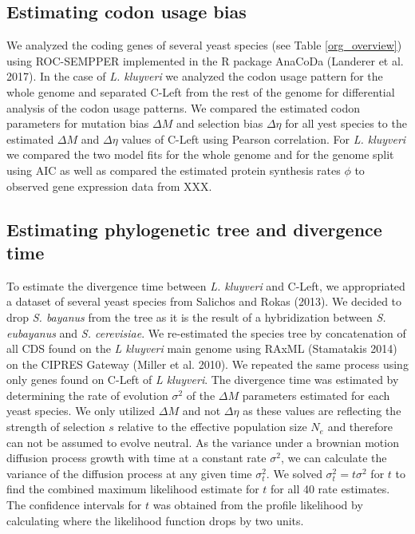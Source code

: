 \documentclass[12pt,draft]{article}
\begin{document}
\subsection{Estimating codon usage bias}
We analyzed the coding genes of several yeast species (see Table \ref{org_overview}) using ROC-SEMPPER \cite{gilchrist2015} implemented in the R package AnaCoDa (Landerer et al. 2017).
In the case of \textit{L. kluyveri} we analyzed the codon usage pattern for the whole genome and separated C-Left from the rest of the genome for differential analysis of the codon usage patterns.
We compared the estimated codon parameters for mutation bias $\Delta M$ and selection bias $\Delta \eta$ for all yest species to the estimated $\Delta M$ and $\Delta \eta$ values of C-Left using Pearson correlation.
For \textit{L. kluyveri} we compared the two model fits for the whole genome and for the genome split using AIC as well as compared the estimated protein synthesis rates $\phi$ to observed gene expression data from XXX.

\subsection{Estimating phylogenetic tree and divergence time}
To estimate the divergence time between \textit{L. kluyveri} and C-Left, we appropriated a dataset of several yeast species from Salichos and Rokas (2013). 
We decided to drop \textit{S. bayanus} from the tree as it is the result of a hybridization between \textit{S. eubayanus} and \textit{S. cerevisiae}.
We re-estimated the species tree by concatenation of all CDS found on the \textit{L kluyveri} main genome using RAxML (Stamatakis 2014) on the CIPRES Gateway (Miller et al. 2010).
We repeated the same process using only genes found on C-Left of \textit{L kluyveri}.
The divergence time was estimated by determining the rate of evolution $\sigma^2$ of the $\Delta M$ parameters estimated for each yeast species.
We only utilized $\Delta M$ and not $\Delta \eta$ as these values are reflecting the strength of selection $s$ relative to the effective population size $N_e$ and therefore can not be assumed to evolve neutral.
As the variance under a brownian motion diffusion process growth with time at a constant rate $\sigma^2$, we can calculate the variance of the diffusion process at any given time $\sigma^2_t$. 
We solved $\sigma^2_t = t\sigma^2$ for $t$ to find the combined maximum likelihood estimate for $t$ for all 40 rate estimates.
The confidence intervals for $t$ was obtained from the profile likelihood by calculating where the likelihood function drops by two units.
  
\end{document}
